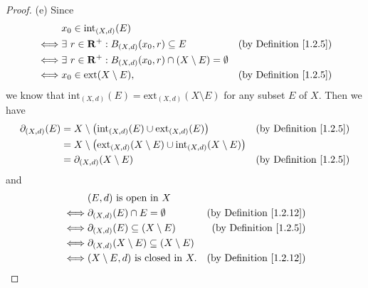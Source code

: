 \begin{proof}{(e)}
    Since
    \begin{align*}
             & x_0 \in \text{int}_{(X, d)}(E)                                                                                         \\
        \iff & \exists\ r \in \mathbf{R}^+ : B_{(X, d)}(x_0, r) \subseteq E                      & \text{(by Definition \ref{1.2.5})} \\
        \iff & \exists\ r \in \mathbf{R}^+ : B_{(X, d)}(x_0, r) \cap (X \setminus E) = \emptyset                                      \\
        \iff & x_0 \in \text{ext}(X \setminus E),                                                & \text{(by Definition \ref{1.2.5})}
    \end{align*}
    we know that \(\text{int}_{(X, d)}(E) = \text{ext}_{(X, d)}(X \setminus E)\) for any subset \(E\) of \(X\).
    Then we have
    \begin{align*}
        \partial_{(X, d)}(E) & = X \setminus \big(\text{int}_{(X, d)}(E) \cup \text{ext}_{(X, d)}(E)\big)                         & \text{(by Definition \ref{1.2.5})} \\
                             & = X \setminus \big(\text{ext}_{(X, d)}(X \setminus E) \cup \text{int}_{(X, d)}(X \setminus E)\big)                                      \\
                             & = \partial_{(X, d)}(X \setminus E)                                                                 & \text{(by Definition \ref{1.2.5})}
    \end{align*}
    and
    \begin{align*}
             & (E, d) \text{ is open in } X                                                                     \\
        \iff & \partial_{(X, d)}(E) \cap E = \emptyset                    & \text{(by Definition \ref{1.2.12})} \\
        \iff & \partial_{(X, d)}(E) \subseteq (X \setminus E)             & \text{(by Definition \ref{1.2.5})}  \\
        \iff & \partial_{(X, d)}(X \setminus E) \subseteq (X \setminus E)                                       \\
        \iff & (X \setminus E, d) \text{ is closed in } X.                & \text{(by Definition \ref{1.2.12})}
    \end{align*}
\end{proof}

